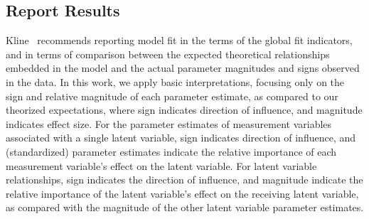 \subsection{Report Results}
Kline~\cite{kline2015principles} recommends reporting model fit in the terms of the global fit indicators, and in terms of comparison between the expected theoretical relationships embedded in the model and the actual parameter magnitudes and signs observed in the data. In this work, we apply basic interpretations, focusing only on the sign and relative magnitude of each parameter estimate, as compared to our theorized expectations, where sign indicates direction of influence, and magnitude indicates effect size. For the parameter estimates of measurement variables associated with a single latent variable, sign indicates direction of influence, and (standardized) parameter estimates indicate the relative importance of each measurement variable's effect on the latent variable. For latent variable relationships, sign indicates the direction of influence, and magnitude indicate the relative importance of the latent variable's effect on the receiving latent variable, as compared with the magnitude of the other latent variable parameter estimates.